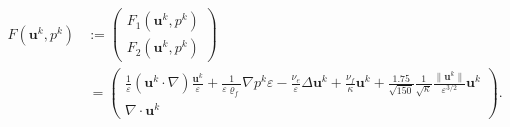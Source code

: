 \documentclass{article}
\newcommand{\norm}[1]{\lVert#1\rVert}
\newcommand{\vect}[1]{\mathbf{#1}}
\begin{document}
\begin{align}\label{eqn:Feq}
F(\vect u^k,p^k) &\!:=
\begin{pmatrix}
F_1(\vect u^k,p^k)\\
F_2(\vect u^k,p^k)
\end{pmatrix} \nonumber \\
&\,=
\begin{pmatrix}
\frac{1}{\varepsilon} \left( \vect u^k \cdot \nabla \right) \frac{ \vect u^k}{\varepsilon}  + \frac{1}{\varepsilon{\varrho_f}} {\nabla p^k \varepsilon} - \frac{{\nu_e}}{\varepsilon} \Delta  \vect u^k  + \frac{\nu_f  }{\kappa}\vect u^k + \frac{1.75}{\sqrt{150}} \frac{1}{\sqrt{\kappa}} \frac{\norm{\vect u^k}}{\varepsilon^{3/2}} \vect u^k\\
\nabla \cdot  \vect u^k
\end{pmatrix}.
\end{align}
\end{document}
